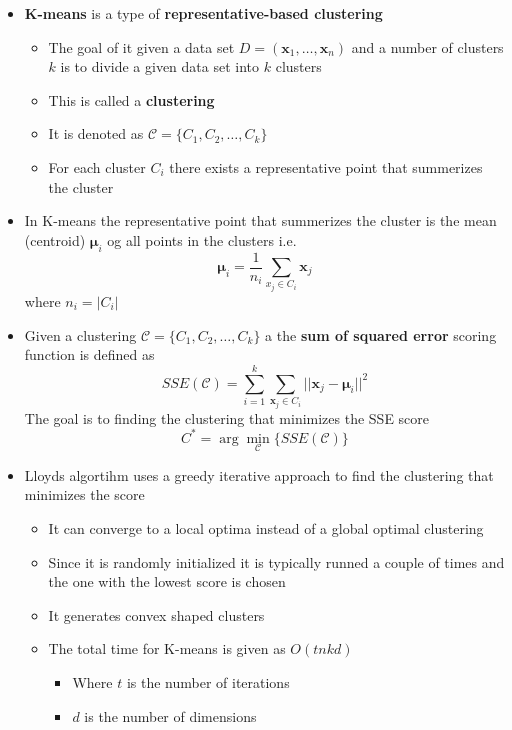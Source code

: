 \documentclass[a4, english]{article}
\begin{document}
\begin{itemize}
	\item \textbf{K-means} is a type of \textbf{representative-based clustering}
  \begin{itemize}
  	\item The goal of it given a data set $D = (\pmb x_1, \dots, \pmb x_n)$ and a number of clusters $k$ is to divide a given data set into $k$ clusters 
	  \item This is called a \textbf{clustering}
  	\item It is denoted as $\mathcal C = \{C_1, C_2, \dots, C_k\}$
    \item For each cluster $C_i$ there exists a representative point that summerizes the cluster 
  \end{itemize}
  \item In K-means the representative point that summerizes the cluster is the mean (centroid) $\pmb \mu_i$ og all points in the clusters i.e.
\begin{equation*}
  \pmb \mu_i = \frac1{n_i} \sum _{x_j \in C_i} \pmb x_j
\end{equation*}
where $n_i = |C_i|$
  \item Given a clustering $\mathcal C = \{C_1, C_2, \dots, C_k\}$ a the \textbf{sum of squared error} scoring function is defined as
  \begin{equation*}
    SSE(\mathcal C) = \sum_{i=1}^k \sum_{\pmb x_j \in C_i} ||\pmb x_j - \pmb \mu_i ||^2
  \end{equation*}
  The goal is to finding the clustering that minimizes the SSE score 
  \begin{equation*}
    C^* = \arg \min_{\mathcal C} \{SSE(\mathcal C)\}
  \end{equation*}
  \item Lloyds algortihm uses a greedy iterative approach to find the clustering that minimizes the score
  \begin{itemize}
  	\item It can converge to a local optima instead of a global optimal clustering  
    \item Since it is randomly initialized it is typically runned a couple of times and the one with the lowest score is chosen    
  	\item It generates convex shaped clusters
  	\item The total time for K-means is given as $O(tnkd)$
    \begin{itemize}
      \item Where $t$ is the number of iterations
      \item $d$ is the number of dimensions 
    \end{itemize}
  \end{itemize}
\end{itemize}
\end{document}
